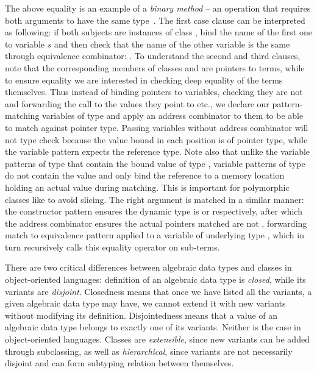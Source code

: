 \noindent
The above equality is an example of a \emph{binary method} -- an operation that 
requires both arguments to have the same type~\cite{BCCLP95}. The first case 
clause can be interpreted as following: if both subjects are instances of class 
, bind the name of the first one to variable $s$ and then check that 
the name of the other variable is the same through equivalence combinator: 
. To understand the second and third clauses, note that the 
corresponding members of classes  and  are pointers to 
terms, while to ensure equality we are interested in checking deep equality of 
the terms themselves. Thus instead of binding pointers to variables, checking 
they are not  and forwarding the call to the values they point to 
etc., we declare our pattern-matching variables of type  
and apply an address combinator to them to be able to match against pointer 
type. Passing variables without address combinator will not type check because 
the value bound in each position is of pointer type, while the variable pattern 
expects the reference type. Note also that unlike the variable patterns of type 
 that contain the bound value of type , variable patterns 
of type  do not contain the value and only bind the reference to a 
memory location holding an actual value during matching. This is important for 
polymorphic classes like  to avoid slicing. The right argument is 
matched in a similar manner: the constructor pattern ensures the dynamic type is 
 or  respectively, after which the address combinator 
ensures the actual pointers matched are not , forwarding match to 
equivalence pattern applied to a variable of underlying type , 
which in turn recursively calls this equality operator on sub-terms.

There are two critical differences between algebraic data types and classes in 
object-oriented languages: definition of an algebraic data type is \emph{closed}, 
while its variants are \emph{disjoint}. Closedness means that once we have listed 
all the variants, a given algebraic data type may have, we cannot extend it with 
new variants without modifying its definition. Disjointedness means that a value 
of an algebraic data type belongs to exactly one of its variants. Neither is the 
case in object-oriented languages. Classes are \emph{extensible}, since new 
variants can be added through subclassing, as well as \emph{hierarchical}, since 
variants are not necessarily disjoint and can form subtyping relation between 
themselves.

